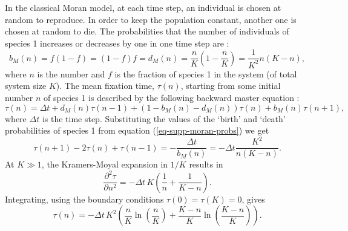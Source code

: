 In the classical Moran model, at each time step, an individual is chosen at random to reproduce. In order to keep the population constant, another one is chosen at random to die. %
The probabilities that the number of individuals of species 1 increases or decreases by one  in one time step are \cite{Moran1962}:
\begin{equation}
b_{M}(n) = f(1-f) = (1-f)f = d_{M}(n) = \frac{n}{K}\left(1-\frac{n}{K}\right) = \frac{1}{K^2}n(K-n),
\label{eq-supp-moran-probs}
\end{equation}
where $n$ is the number and $f$ is the fraction of species 1 in the system (of total system size $K$). 
The mean fixation time, $\tau(n)$, starting from some initial number $n$ of species 1 is described by the following backward master equation \cite{Nisbet1982}:
\begin{equation*}
\tau(n) = \Delta t + d_{M}(n)\tau(n-1) + \left(1-b_{M}(n)-d_{M}(n)\right)\tau(n) + b_{M}(n)\tau(n+1),
\end{equation*}
where $\Delta t$ is the time step. 
Substituting the values of the `birth' and `death' probabilities of species 1 from equation (\ref{eq-supp-moran-probs}) we get
\begin{equation*}
\tau(n+1) - 2\tau(n) + \tau(n-1) = -\frac{\Delta t}{b_{M}(n)} = -\Delta t\frac{K^2}{n(K-n)}.
\end{equation*}
At $K\gg 1$, the Kramers-Moyal expansion in $1/K$ results in
\begin{equation*}
\frac{\partial^2\tau}{\partial n^2} = -\Delta t\,K\left(\frac{1}{n}+\frac{1}{K-n}\right).
\end{equation*}
Integrating, using the boundary conditions  $\tau(0) = \tau(K)=0$, gives
\begin{equation}
\tau(n) = -\Delta t\,K^2\left(\frac{n}{K}\ln\left(\frac{n}{K}\right)+\frac{K-n}{K}\ln\left(\frac{K-n}{K}\right)\right).
 \label{Morantime}
\end{equation}

